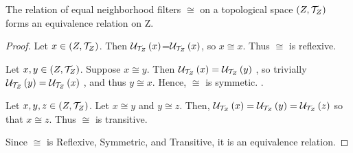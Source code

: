 
\begin{prop}
    \label{prop:EqualNeighborhoodFiltersEquivalenceRelation}
    
    The relation of equal neighborhood filters $\cong$ on a topological space $(Z,\mathcal{T}_Z)$ forms an equivalence relation on Z. 
    \begin{proof}
        
        Let $x \in (Z,\mathcal{T}_Z)$. 
        Then $\mathcal{U}_{\mathcal{T}_{Z}}\left( x\right)$=$\mathcal{U}_{\mathcal{T}_{Z}}\left( x\right)$, so $x \cong x$.
        Thus $\cong$ is reflexive. 
        
        Let $x,y \in (Z,\mathcal{T}_Z)$. 
        Suppose $x \cong y$. 
        Then  $\mathcal{U}_{\mathcal{T}_{Z}}\left( x\right) = \mathcal{U}_{\mathcal{T}_{Z}}\left( y\right)$
        , so trivially  $\mathcal{U}_{\mathcal{T}_{Z}}\left( y\right) =\mathcal{U}_{\mathcal{T}_{Z}}\left( x\right)$
        , and thus $y \cong x$.
        Hence, $\cong$ is symmetic. . 
        
        Let $x,y,z \in (Z,\mathcal{T}_Z)$.
        Let $x \cong y$ and $y \cong z$. 
        Then, 
         $\mathcal{U}_{\mathcal{T}_{Z}}\left( x\right)= \mathcal{U}_{\mathcal{T}_{Z}}\left( y\right) =  \mathcal{U}_{\mathcal{T}_{Z}}\left( z\right)$
         so that $x \cong z$.
         Thus $\cong$ is transitive. 
         
         Since $\cong$ is Reflexive, Symmetric, and Transitive, it is an equivalence relation. 
        
    \end{proof}
\end{prop}